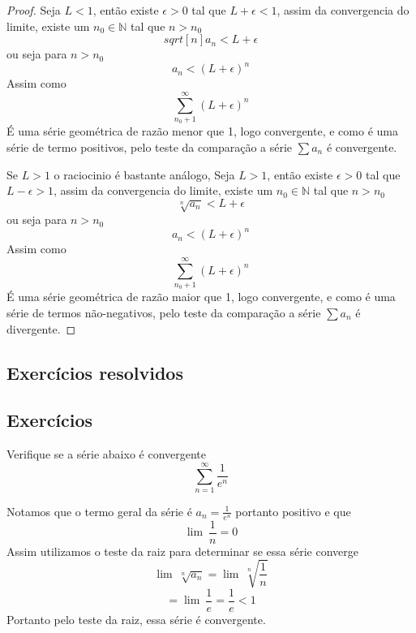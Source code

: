 \begin{proof}
    Seja $L<1$, então existe $\epsilon > 0$ tal que $L + \epsilon < 1$, assim
    da convergencia do limite, existe um $n_0 \in \mathbb{N}$ tal que $n>n_0$
    $$ sqrt[n]{a_n} < L + \epsilon$$
    ou seja para $n>n_0$
    $$ a_n < (L + \epsilon)^{n}$$    
    Assim como 
    $$\sum_{n_0+1}^{\infty} (L + \epsilon)^{n} $$
    É uma série geométrica de razão menor que 1, logo convergente, e como
    é uma série de termo positivos, pelo teste da comparação a série $\sum a_n$
    é convergente.

    Se $L>1$ o raciocinio é bastante análogo, Seja $L>1$, então existe $\epsilon > 0$
    tal que $L - \epsilon > 1$, assim da convergencia do limite, existe um 
    $n_0 \in \mathbb{N}$ tal que $n>n_0$
    $$ \sqrt[n]{a_n} < L + \epsilon$$
    ou seja para $n>n_0$
    $$ a_n < (L + \epsilon)^{n}$$    
    Assim como 
    $$\sum_{n_0+1}^{\infty} (L + \epsilon)^{n} $$   
    É uma série geométrica de razão maior que 1, logo convergente, e como
    é uma série de termos não-negativos, pelo teste da comparação a série $\sum a_n$
    é divergente.

\end{proof}

\subsection*{Exercícios resolvidos}

\construirExeresol


\subsection*{Exercícios}

\construirExer

\begin{exer}
    Verifique se a série abaixo é convergente 
    $$\sum_{n =1}^{\infty} \frac{1}{e^n}$$
\end{exer}

\begin{exer}
    Notamos que o termo geral da série é $a_n = \frac{1}{e^n}$ portanto positivo
    e que
    $$\lim{\:} \frac{1}{n} = 0$$
    Assim utilizamos o teste da raiz para determinar se essa série converge
    $$\lim{\:} \sqrt[n]{a_n} = \lim{\:} \sqrt[n]{\frac{1}{n}} $$
    $$ = \lim{\:} \frac{1}{e} = \frac{1}{e} < 1 $$
    Portanto pelo teste da raiz, essa série é convergente.
\end{exer}


